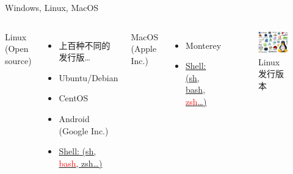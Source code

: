 

\begin{frame}{Windows, Linux, MacOS}
    \begin{columns}
        Linux (Open source)

        \begin{itemize}
            \item 上百种不同的发行版\dots
            \item Ubuntu/Debian
            \item CentOS
            \item Android (Google Inc.)
            \item \underline{Shell: (sh, \textcolor{red}{bash}, zsh\dots)}
        \end{itemize}

        MacOS (Apple Inc.)
        \begin{itemize}
            \item Monterey
            \item \underline{Shell: (sh, bash, \textcolor{red}{zsh}\dots)}
        \end{itemize}
        \begin{figure}
            \centering
            \includegraphics[width=6cm]{Images/distros_linux.jpeg}
            \caption{Linux发行版本}
        \end{figure}
    \end{columns}
\end{frame}

